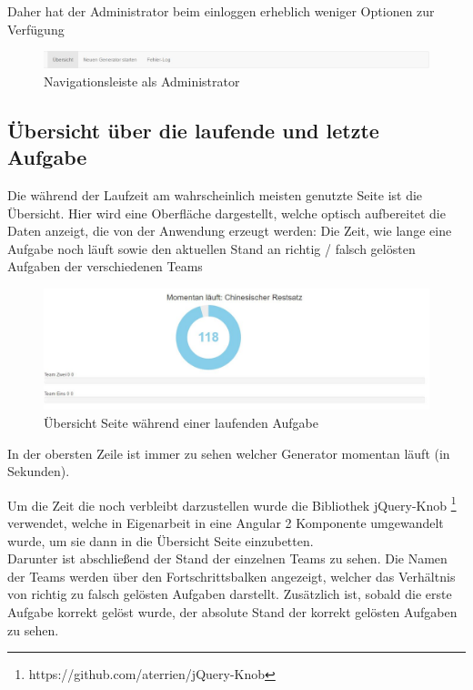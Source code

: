 Daher hat der Administrator beim einloggen erheblich weniger Optionen zur Verfügung
\begin{figure}[htp]     %
\centering
\includegraphics[width=1\textwidth]{bilder/NavBarAdmin} 
\caption[Navigationsleiste als Administrator]{Navigationsleiste als Administrator}
\end{figure} 

\subsection{Übersicht über die laufende und letzte Aufgabe}

Die während der Laufzeit am wahrscheinlich meisten genutzte Seite ist die Übersicht. Hier wird eine Oberfläche dargestellt, welche optisch aufbereitet die Daten anzeigt, die von der Anwendung erzeugt werden: Die Zeit, wie lange eine Aufgabe noch läuft sowie den aktuellen Stand an richtig / falsch gelösten Aufgaben der verschiedenen Teams \\
\begin{figure}[htp]     %
\centering
\includegraphics[width=1\textwidth]{bilder/Overview} 
\caption[Übersicht Seite während einer laufenden Aufgabe]{Übersicht Seite während einer laufenden Aufgabe}
\end{figure} 
In der obersten Zeile ist immer zu sehen welcher Generator momentan läuft (in Sekunden).

Um die Zeit die noch verbleibt darzustellen wurde die Bibliothek jQuery-Knob \footnote{https://github.com/aterrien/jQuery-Knob} verwendet, welche in Eigenarbeit in eine Angular 2 Komponente umgewandelt wurde, um sie dann in die Übersicht Seite einzubetten. \\

Darunter ist abschließend der Stand der einzelnen Teams zu sehen. Die Namen der Teams werden über den Fortschrittsbalken angezeigt, welcher das Verhältnis von richtig zu falsch gelösten Aufgaben darstellt. Zusätzlich ist, sobald die erste Aufgabe korrekt gelöst wurde, der absolute Stand der korrekt gelösten Aufgaben zu sehen. \\


